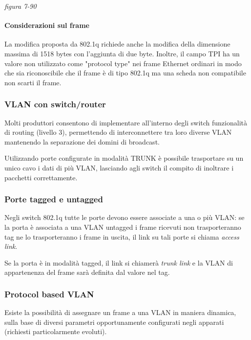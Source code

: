 \documentclass[
]{article}
\begin{document}
\emph{figura 7-90}

\hypertarget{header-n345}{%
\paragraph{Considerazioni sul frame}\label{header-n345}}

La modifica proposta da 802.1q richiede anche la modifica della
dimensione massima di 1518 bytes con l'aggiunta di due byte. Inoltre, il
campo TPI ha un valore non utilizzato come "protocol type" nei frame
Ethernet ordinari in modo che sia riconoscibile che il frame è di tipo
802.1q ma una scheda non compatibile non scarti il frame.

\hypertarget{header-n347}{%
\subsubsection{VLAN con switch/router}\label{header-n347}}

Molti produttori consentono di implementare all'interno degli switch
funzionalità di routing (livello 3), permettendo di interconnettere tra
loro diverse VLAN mantenendo la separazione dei domini di broadcast.

Utilizzando porte configurate in modalità TRUNK è possibile trasportare
su un unico cavo i dati di più VLAN, lasciando agli switch il compito di
inoltrare i pacchetti correttamente.

\hypertarget{header-n350}{%
\subsubsection{Porte tagged e untagged}\label{header-n350}}

Negli switch 802.1q tutte le porte devono essere associate a una o più
VLAN: se la porta è associata a una VLAN untagged i frame ricevuti non
trasporteranno tag ne lo trasporteranno i frame in uscita, il link su
tali porte si chiama \emph{access link}.

Se la porta è in modalità tagged, il link si chiamerà \emph{trunk link}
e la VLAN di appartenenza del frame sarà definita dal valore nel tag.

\hypertarget{header-n353}{%
\subsubsection{Protocol based VLAN}\label{header-n353}}

Esiste la possibilità di assegnare un frame a una VLAN in maniera
dinamica, sulla base di diversi parametri opportunamente configurati
negli apparati (richiesti particolarmente evoluti).
\end{document}
